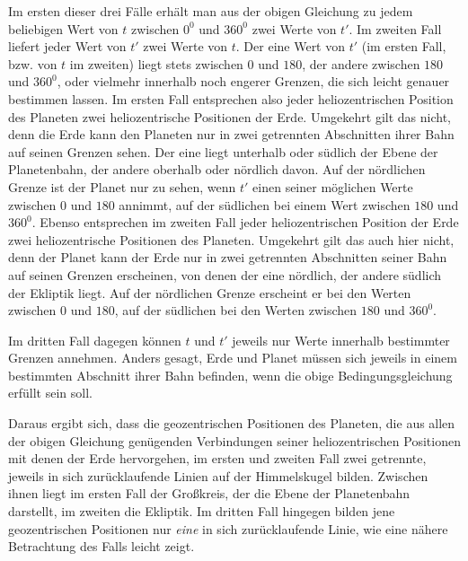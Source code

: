 Im ersten dieser drei Fälle erhält man aus der obigen Gleichung zu
jedem beliebigen Wert von $t$ zwischen $0^0$ und $360^0$ zwei Werte
von $t'$. Im zweiten Fall liefert jeder Wert von $t'$ zwei Werte
von $t$. Der eine Wert von $t'$ (im ersten Fall, bzw. von $t$ im
zweiten) liegt stets zwischen $0$ und $180$, der andere zwischen $180$
und $360^0$, oder vielmehr innerhalb noch engerer Grenzen, die sich
leicht genauer bestimmen lassen. Im ersten Fall entsprechen also
jeder heliozentrischen Position des Planeten zwei heliozentrische
Positionen der Erde. Umgekehrt gilt das nicht, denn die Erde kann den
Planeten nur in zwei getrennten Abschnitten ihrer Bahn auf seinen
Grenzen sehen. Der eine liegt unterhalb oder südlich der Ebene der
Planetenbahn, der andere oberhalb oder nördlich davon. Auf der
nördlichen Grenze ist der Planet nur zu sehen, wenn $t'$ einen seiner
möglichen Werte zwischen $0$ und $180$ annimmt, auf der südlichen bei
einem Wert zwischen $180$ und $360^0$. Ebenso entsprechen im zweiten
Fall jeder heliozentrischen Position der Erde zwei heliozentrische
Positionen des Planeten. Umgekehrt gilt das auch hier nicht, denn der
Planet kann der Erde nur in zwei getrennten Abschnitten seiner Bahn
auf seinen Grenzen erscheinen, von denen der eine nördlich, der
andere südlich der Ekliptik liegt. Auf der nördlichen Grenze erscheint
er bei den Werten zwischen $0$ und $180$, auf der südlichen bei den
Werten zwischen $180$ und $360^0$.

Im dritten Fall dagegen können $t$ und $t'$ jeweils nur Werte
innerhalb bestimmter Grenzen annehmen. Anders gesagt, Erde und
Planet müssen sich jeweils in einem bestimmten Abschnitt ihrer
Bahn befinden, wenn die obige Bedingungsgleichung erfüllt sein soll.

Daraus ergibt sich, dass die geozentrischen Positionen des Planeten,
die aus allen der obigen Gleichung genügenden Verbindungen seiner
heliozentrischen Positionen mit denen der Erde hervorgehen, im ersten
und zweiten Fall zwei getrennte, jeweils in sich zurücklaufende Linien
auf der Himmelskugel bilden. Zwischen ihnen liegt im ersten Fall der
Großkreis, der die Ebene der Planetenbahn darstellt, im zweiten die
Ekliptik.
%
Im dritten Fall hingegen bilden jene geozentrischen Positionen nur
\textit{eine} in sich zurücklaufende Linie, wie eine nähere Betrachtung
des Falls leicht zeigt.

